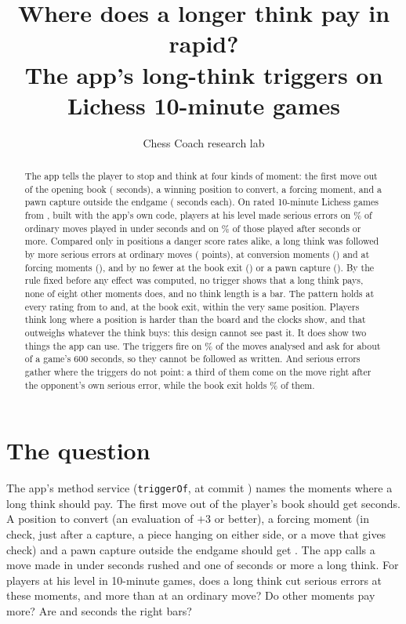 \documentclass[11pt]{article}
\title{Where does a longer think pay in rapid?\\[0.3em]
\large The app's long-think triggers on \GamesBuilt{} Lichess 10-minute games}
\author{Chess Coach research lab}
\date{}
\begin{document}
\maketitle

\begin{abstract}
The app tells the player to stop and think at four kinds of moment: the first move out of the
opening book (\BookEnd{} seconds), a winning position to convert, a forcing moment, and a pawn
capture outside the endgame (\Deep{} seconds each). On \GamesBuilt{} rated 10-minute Lichess games
from \Month, built with the app's own code, players at his level made serious errors on
\NoneRateQuick\% of ordinary moves played in under \Rushed{} seconds and on \NoneRateLong\% of those
played after \Deep{} seconds or more. Compared only in positions a danger score rates alike, a long
think was followed by more serious errors at ordinary moves (\NoneDelta{} points), at conversion
moments (\ConversionDelta) and at forcing moments (\ForcingDelta), and by no fewer at the book exit
(\BookEndDelta) or a pawn capture (\StructureDelta). By the rule fixed before any effect was
computed, no trigger shows that a long think pays, none of eight other moments does, and no think
length is a bar. The pattern holds at every rating from \RatingLo{} to \RatingHi{} and, at the book exit, within
the very same position. Players think long where a position is harder than the board and the
clocks show, and that outweighs whatever the think buys: this design cannot see past it. It does
show two things the app can use. The triggers fire on \TriggerShare\% of the moves analysed and ask
for about \AskedSeconds{} of a game's 600 seconds, so they cannot be followed as written. And
serious errors gather where the triggers do not point: a third of them come on the move right
after the opponent's own serious error, while the book exit holds \BookEndErrors\% of them.
\end{abstract}

\section{The question}

The app's method service (\texttt{triggerOf}, at commit \texttt{\AppCommit}) names the moments
where a long think should pay. The first move out of the player's book should get \BookEnd{}
seconds. A position to convert (an evaluation of $+3$ or better), a forcing moment (in check, just
after a capture, a piece hanging on either side, or a move that gives check) and a pawn capture
outside the endgame should get \Deep. The app calls a move made in under \Rushed{} seconds rushed
and one of \Deep{} seconds or more a long think. For players at his level in 10-minute games, does
a long think cut serious errors at these moments, and more than at an ordinary move? Do other
moments pay more? Are \Deep{} and \BookEnd{} seconds the right bars?
\end{document}

